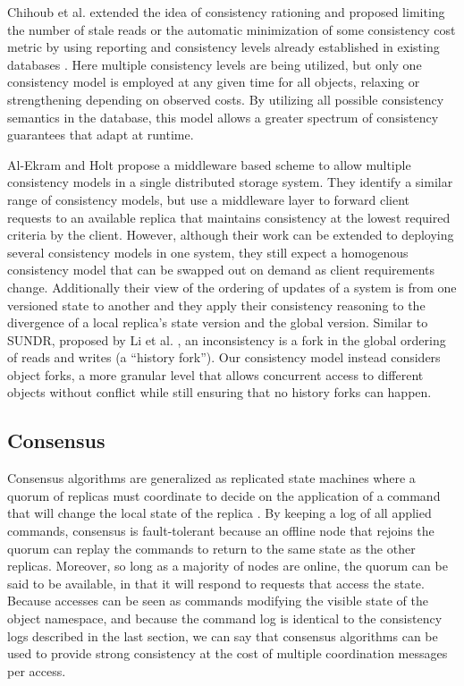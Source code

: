 \documentclass{article}
\begin{document}
Chihoub et al. extended the idea of consistency rationing and proposed limiting the number of stale reads or the automatic minimization of some consistency cost metric by using reporting and consistency levels already established in existing databases \cite{chihoub_harmony:_2012,chihoub_consistency_2013}. Here multiple consistency levels are being utilized, but only one consistency model is employed at any given time for all objects, relaxing or strengthening depending on observed costs. By utilizing all possible consistency semantics in the database, this model allows a greater spectrum of consistency guarantees that adapt at runtime.

Al-Ekram and Holt \cite{al-ekram_multi-consistency_2010} propose a middleware based scheme to allow multiple consistency models in a single distributed storage system. They identify a similar range of consistency models, but use a middleware layer to forward client requests to an available replica that maintains consistency at the lowest required criteria by the client. However, although their work can be extended to deploying several consistency models in one system, they still expect a homogenous consistency model that can be swapped out on demand as client requirements change. Additionally their view of the ordering of updates of a system is from one versioned state to another and they apply their consistency reasoning to the divergence of a local replica's state version and the global version. Similar to SUNDR, proposed by Li et al. \cite{li_secure_2004}, an inconsistency is a fork in the global ordering of reads and writes (a ``history fork''). Our consistency model instead considers object forks, a more granular level that allows concurrent access to different objects without conflict while still ensuring that no history forks can happen.

\subsection{Consensus}
\label{sec:consensus}

Consensus algorithms are generalized as replicated state machines where a quorum of replicas must coordinate to decide on the application of a command that will change the local state of the replica \cite{schneider_implementing_1990}. By keeping a log of all applied commands, consensus is fault-tolerant because an offline node that rejoins the quorum can replay the commands to return to the same state as the other replicas.   Moreover, so long as a majority of nodes are online, the quorum can be said to be available, in that it will respond to requests that access the state. Because accesses can be seen as commands modifying the visible state of the object namespace, and because the command log is identical to the consistency logs described in the last section, we can say that consensus algorithms can be used to provide strong consistency at the cost of multiple coordination messages per access.
\end{document}
